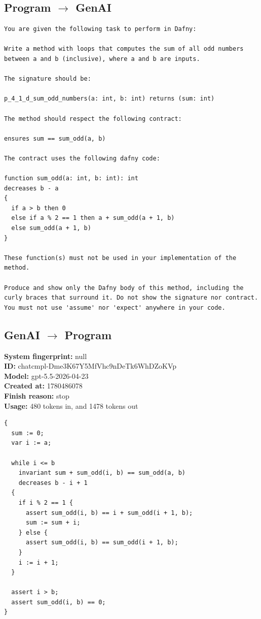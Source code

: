 \documentclass{article}
\begin{document}
\subsection*{Program $\rightarrow$ GenAI}
\begin{lstlisting}
You are given the following task to perform in Dafny:

Write a method with loops that computes the sum of all odd numbers between a and b (inclusive), where a and b are inputs.

The signature should be:

p_4_1_d_sum_odd_numbers(a: int, b: int) returns (sum: int)

The method should respect the following contract:

ensures sum == sum_odd(a, b)

The contract uses the following dafny code:

function sum_odd(a: int, b: int): int
decreases b - a
{
  if a > b then 0
  else if a % 2 == 1 then a + sum_odd(a + 1, b)
  else sum_odd(a + 1, b)
}

These function(s) must not be used in your implementation of the method.

Produce and show only the Dafny body of this method, including the curly braces that surround it. Do not show the signature nor contract. You must not use 'assume' nor 'expect' anywhere in your code.
\end{lstlisting}
\subsection*{GenAI $\rightarrow$ Program}
\textbf{System fingerprint: }null
\\\textbf{ID: }chatcmpl-Dme3K67Y5MfVhc9nDeTk6WhDZoKVp
\\\textbf{Model: }gpt-5.5-2026-04-23
\\\textbf{Created at: }1780486078
\\\textbf{Finish reason: }stop
\\\textbf{Usage: }480 tokens in, and 1478 tokens out
\begin{lstlisting}
{
  sum := 0;
  var i := a;

  while i <= b
    invariant sum + sum_odd(i, b) == sum_odd(a, b)
    decreases b - i + 1
  {
    if i % 2 == 1 {
      assert sum_odd(i, b) == i + sum_odd(i + 1, b);
      sum := sum + i;
    } else {
      assert sum_odd(i, b) == sum_odd(i + 1, b);
    }
    i := i + 1;
  }

  assert i > b;
  assert sum_odd(i, b) == 0;
}
\end{lstlisting}
\end{document}

